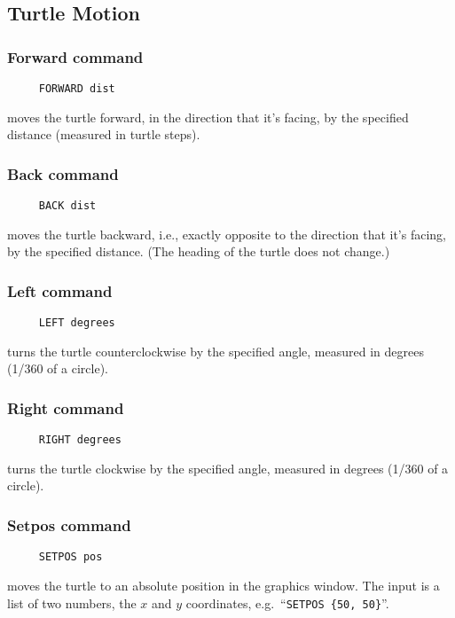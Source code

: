 \subsection{Turtle Motion}

\subsubsection*{Forward command}
\begin{verbatim}
     FORWARD dist
\end{verbatim}
moves the turtle forward, in the direction that it's facing, by the
specified distance (measured in turtle steps).

\subsubsection*{Back command}
\begin{verbatim}
     BACK dist
\end{verbatim}
moves the turtle backward, i.e., exactly opposite to the direction
that it's facing, by the specified distance.  (The heading of the
turtle does not change.)

\subsubsection*{Left command}
\begin{verbatim}
     LEFT degrees
\end{verbatim}
turns the turtle counterclockwise by the specified angle, measured in
degrees (1/360 of a circle).

\subsubsection*{Right command}
\begin{verbatim}
     RIGHT degrees
\end{verbatim}
turns the turtle clockwise by the specified angle, measured in degrees
(1/360 of a circle).

\subsubsection*{Setpos command}
\begin{verbatim}
     SETPOS pos
\end{verbatim}
\label{logoturtle:setpos}
moves the turtle to an absolute position in the graphics window.  The
input is a list of two numbers, the $x$ and $y$ coordinates,
e.g.\ ``\texttt{SETPOS \{50, 50\}}''.

